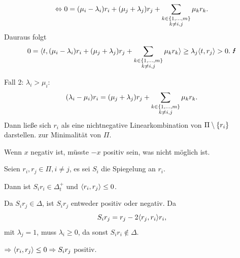\documentclass[18pt,handout]{beamer}
\begin{document}
\begin{frame}
    \begin{bew}
        \[ \Leftrightarrow 0 = (\mu_i - \lambda_i)
        r_i + (\mu_j + \lambda_j) 
        r_j + 
        \sum_{
            \substack{k \in \{1,\ldots, m\}\\k \neq i,j}}
        \mu_k r_k. \] \pause
        Dauraus folgt 
        \[ 0 = \scalarprod{t}{ 
            (\mu_i - \lambda_i) r_i + (\mu_j + \lambda_j) r_j 
        + \sum_{\substack{k \in \set{1,\ldots, m}\\k \neq i,j}}
        \mu_k r_k
        } \geq \lambda_j \scalarprod{t}{r_j} > 0. 
        \text{ \Lightning} \]

        \renewcommand{\qedsymbol}{}
    \end{bew}
\end{frame}

\begin{frame}
    \begin{bew}
        Fall 2: \( \lambda_i > \mu_i \): 
        \[ (\lambda_i - \mu_i) r_i
        = (\mu_j + \lambda_j) r_j 
        + \sum_{\substack{k \in \{1,\ldots, m\}\\k \neq i,j}}
        \mu_k r_k. \]
        Dann ließe sich \( r_i \) als eine 
        nichtnegative Linearkombination von 
        \( \Pi \setminus \{r_i\} \) darstellen. 
        \Lightning{} zur Minimalität von 
        \( \Pi \).

        Wenn \( x \) negativ ist, müsste \( -x \) 
        positiv sein, was nicht möglich ist.
    \end{bew}
\end{frame}

\begin{frame}
    \begin{satz} %
        Seien \( r_i, r_j \in \Pi, i \neq j \), es 
        sei \( S_i \) die Spiegelung an \( r_i \). 

        Dann ist \( S_i r_i \in \Delta_t^+ \) und 
        \( \langle r_i, r_j \rangle \leq 0 \).
    \end{satz}
    \pause
    \begin{bew}
        Da \( S_i r_j \in \Delta \), ist \( S_i r_j \) 
        entweder positiv oder negativ. Da 
        \[ S_i r_j = r_j - 2 \langle r_j, r_i \rangle r_i, \]
        mit \( \lambda_j = 1 \), muss 
        \( \lambda_i \geq 0 \), da sonst 
        \( S_i r_i \notin \Delta \). \pause

        \( \Rightarrow \langle r_i, r_j \rangle \leq 0 
        \Rightarrow S_i r_j \) 
        positiv.
    \end{bew}
\end{frame}
\end{document}
